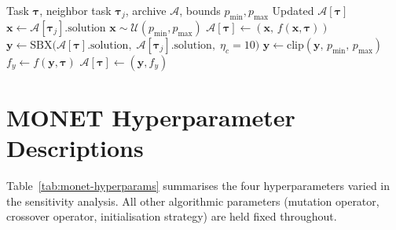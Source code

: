 \documentclass[11pt,a4paper]{article}
\begin{document}
\begin{algorithm}[H]
\caption{Social Learning}\label{alg:social}
\begin{algorithmic}[1]
\Require Task $\boldsymbol{\tau}$, neighbor task $\boldsymbol{\tau}_j$,
         archive $\mathcal{A}$, bounds $p_{\min}, p_{\max}$
\Ensure Updated $\mathcal{A}[\boldsymbol{\tau}]$
        \State $\mathbf{x} \gets
               \mathcal{A}[\boldsymbol{\tau}_j].\text{solution}$
    \Else
        \State $\mathbf{x} \sim \mathcal{U}(p_{\min}, p_{\max})$
    \EndIf
    \State $\mathcal{A}[\boldsymbol{\tau}] \gets (\mathbf{x},\,
           f(\mathbf{x}, \boldsymbol{\tau}))$
    \State \Return
\EndIf
{}
    \State \Return {}
\EndIf
\State $\mathbf{y} \gets \text{SBX}\bigl(
       \mathcal{A}[\boldsymbol{\tau}].\text{solution},\;
       \mathcal{A}[\boldsymbol{\tau}_j].\text{solution},\;
       \eta_c\!=\!10\bigr)$
\State $\mathbf{y} \gets \text{clip}(\mathbf{y},\,
       p_{\min},\, p_{\max})$
\State $f_y \gets f(\mathbf{y}, \boldsymbol{\tau})$
    \State $\mathcal{A}[\boldsymbol{\tau}] \gets (\mathbf{y}, f_y)$
\EndIf
\end{algorithmic}
\end{algorithm}

\section{MONET Hyperparameter Descriptions}\label{sec:hyperparameters}

Table~\ref{tab:monet-hyperparams} summarises the four hyperparameters
varied in the sensitivity analysis. All other algorithmic parameters
(mutation operator, crossover operator, initialisation strategy) are
held fixed throughout.
\end{document}
